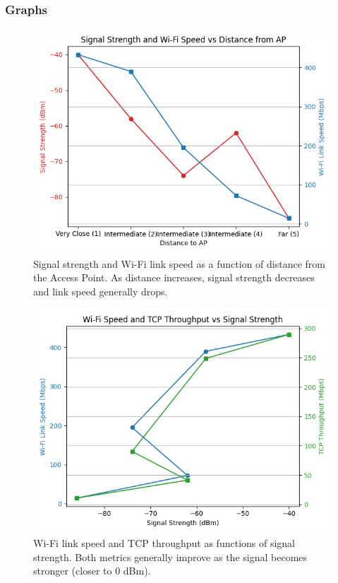 \documentclass{article}
\begin{document}
\subsubsection{Graphs}
\begin{figure}[H]
    \centering
    \includegraphics[width=1\linewidth]{images/signal_strength_wifi_speed_distance.png}
    \caption{Signal strength and Wi-Fi link speed as a function of distance from the Access Point. As distance increases, signal strength decreases and link speed generally drops.}
    \label{fig:signal-strength-wifi-speed-distance}
\end{figure}

\begin{figure}[H]
    \centering
    \includegraphics[width=1\linewidth]{images/wifi-speed-throughput-signal-strength.png}
    \caption{Wi-Fi link speed and TCP throughput as functions of signal strength. Both metrics generally improve as the signal becomes stronger (closer to 0 dBm).}
    \label{fig:signal-strength-wifi-speed-distance}
\end{figure}
\end{document}

